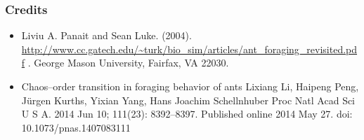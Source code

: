 \documentclass{beamer}
\begin{document}
\begin{frame}
\frametitle{Credits}
\begin{itemize}
\item Liviu A. Panait and Sean Luke. (2004). \url{http://www.cc.gatech.edu/~turk/bio_sim/articles/ant_foraging_revisited.pdf} . George Mason University, Fairfax, VA 22030.
\item Chaos–order transition in foraging behavior of ants
Lixiang Li, Haipeng Peng, Jürgen Kurths, Yixian Yang, Hans Joachim Schellnhuber
Proc Natl Acad Sci U S A. 2014 Jun 10; 111(23): 8392–8397. Published online 2014 May 27. doi: 10.1073/pnas.1407083111
\end{itemize}
\end{frame}
\end{document}
